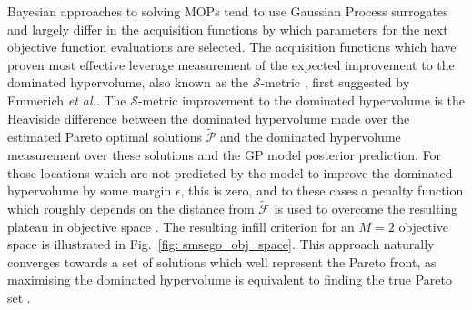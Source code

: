 \documentclass[conference]{IEEEtran}
\makeatletter
\newcommand{\nobj}{M}
\newcommand\hpv{dominated hypervolume\xspace}
\newcommand\gp{GP\xspace}
\newcommand\Papprox{\tilde{\mathcal{P}}}
\newcommand\Fapprox{\tilde{\mathcal{F}}}
\newcommand{\bx}{\mathbf{x}}
\newcommand{\bff}{\mathbf{f}}
\newcommand{\fhat}{\hat{f}}
\newcommand{\fnote}[2][\textcolor{teal}{\dagger}]{$#1$\marginpar{\color{teal}\raggedright\tiny$#1$
    #2}}
\newcommand{\mnotejf}[2][\textcolor{blue}{\dagger}]{$#1$\marginpar{\color{blue}\raggedright\tiny$#1$ #2}}
\newcommand*{\etal}{\textit{et al.}\@\xspace}
\makeatother
\begin{document}
Bayesian approaches to solving MOPs tend to use Gaussian Process surrogates and largely differ in the acquisition functions by which parameters for the next objective function evaluations are selected. The acquisition functions which have proven most effective leverage measurement of the expected improvement to the \hpv, also known as the $\mathcal{S}$-metric  \cite{emmerich2008computation}, first suggested by Emmerich \etal \cite{emmerich2006single}.  The $\mathcal{S}$-metric improvement to the \hpv is the Heaviside difference between the \hpv  made over the estimated Pareto optimal solutions $\Papprox$ and the \hpv measurement over these solutions and the \gp model posterior prediction. For those locations which are not predicted by the model to improve the \hpv by some margin $\epsilon$, this is zero, and to these cases a penalty function which roughly depends on the distance from $\Fapprox$ is used to overcome the resulting plateau in objective space \cite{emmerich2008computation, wagner2010expected}.
The resulting infill criterion for an $\nobj=2$ objective space is illustrated in Fig.\ \ref{fig: smsego_obj_space}. This approach naturally converges towards a set of solutions which well represent the Pareto front, as maximising the \hpv is equivalent to finding the true Pareto set \cite{fleischer2003measure}. 
\end{document}
